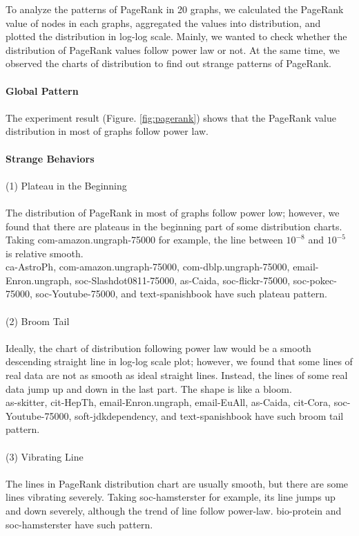 To analyze the patterns of PageRank in 20 graphs, we calculated the PageRank value of nodes in each graphs, aggregated the values into distribution, and plotted the distribution in log-log scale. Mainly, we wanted to check whether the distribution of PageRank values follow power law or not. At the same time, we observed the charts of distribution to find out strange patterns of PageRank.
\\
\\
\textbf{Global Pattern}
\\
\\
The experiment result (Figure. \ref{fig:pagerank}) shows that the PageRank value distribution in most of graphs follow power law.
\\
\\
\textbf{Strange Behaviors}
\\
\\
(1) Plateau in the Beginning
\\
\\
The distribution of PageRank in most of graphs follow power low; however, we found that there are plateaus in the beginning part of some distribution charts. Taking com-amazon.ungraph-75000 for example, the line between $10^{-8}$ and $10^{-5}$ is relative smooth. 
\\
ca-AstroPh, com-amazon.ungraph-75000, com-dblp.ungraph-75000, email-Enron.ungraph, soc-Slashdot0811-75000, as-Caida, soc-flickr-75000, soc-pokec-75000, soc-Youtube-75000, and text-spanishbook have such plateau pattern.
\\
\\
(2) Broom Tail
\\
\\
Ideally, the chart of distribution following power law would be a smooth descending straight line in log-log scale plot; however, we found that some lines of real data are not as smooth as ideal straight lines. Instead, the lines of some real data jump up and down in the last part. The shape is like a bloom.
\\
as-skitter, cit-HepTh, email-Enron.ungraph, email-EuAll, as-Caida, cit-Cora, soc-Youtube-75000, soft-jdkdependency, and text-spanishbook have such broom tail pattern.
\\
\\
(3) Vibrating Line
\\
\\
The lines in PageRank distribution chart are usually smooth, but there are some lines vibrating severely. Taking soc-hamsterster for example, its line jumps up and down severely, although the trend of line follow power-law. bio-protein and soc-hamsterster have such pattern.

